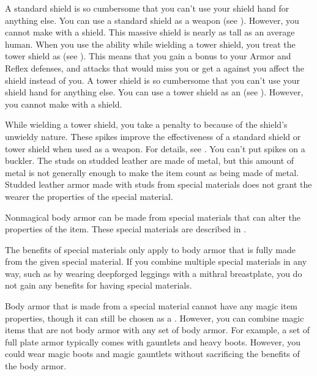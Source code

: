     A standard shield is so cumbersome that you can't use your shield hand for anything else.
    You can use a standard shield as a weapon (see ).
    However, you cannot make  with a shield.
     This massive shield is nearly as tall as an average human.
    When you use the  ability while wielding a tower shield, you treat the tower shield as  (see ).
    This means that you gain a  bonus to your Armor and Reflex defenses, and attacks that would miss you or get a  against you affect the shield instead of you.
    A tower shield is so cumbersome that you can't use your shield hand for anything else.
    You can use a tower shield as an  (see ).
    However, you cannot make  with a shield.

    While wielding a tower shield, you take a  penalty to  because of the shield's unwieldy nature.
     These spikes improve the effectiveness of a standard shield or tower shield when used as a weapon.
    For details, see .
    You can't put spikes on a buckler.
     The studs on studded leather are made of metal, but this amount of metal is not generally enough to make the item count as being made of metal.
    Studded leather armor made with studs from special materials does not grant the wearer the properties of the special material.

    Nonmagical body armor can be made from special materials that can alter the properties of the item.
    These special materials are described in .

    The benefits of special materials only apply to body armor that is fully made from the given special material.
    If you combine multiple special materials in any way, such as by wearing deepforged leggings with a mithral breastplate, you do not gain any benefits for having special materials.

    Body armor that is made from a special material cannot have any magic item properties, though it can still be chosen as a .
    However, you can combine magic items that are not body armor with any set of body armor.
    For example, a set of full plate armor typically comes with gauntlets and heavy boots.
    However, you could wear magic boots and magic gauntlets without sacrificing the benefits of the body armor.


